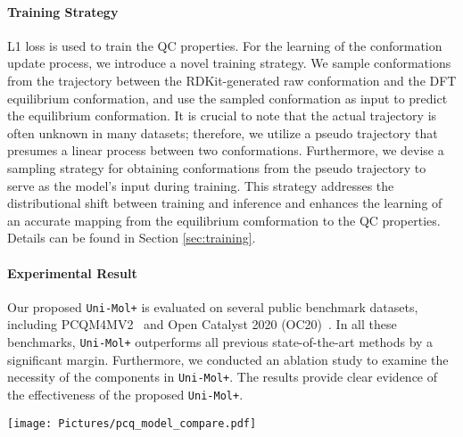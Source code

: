 \documentclass{article}
\newcommand{\name}{\texttt{Uni-Mol+}\xspace}
\begin{document}
\vspace{-6pt}
\paragraph{Training Strategy}
L1 loss is used to train the QC properties. For the learning of the conformation update process, we introduce a novel training strategy. We sample conformations from the trajectory between the RDKit-generated raw conformation and the DFT equilibrium conformation, and use the sampled conformation as input to predict the equilibrium conformation. It is crucial to note that the actual trajectory is often unknown in many datasets; therefore, we utilize a pseudo trajectory that presumes a linear process between two conformations. Furthermore, we devise a sampling strategy for obtaining conformations from the pseudo trajectory to serve as the model's input during training. 
This strategy addresses the distributional shift between training and inference and enhances the learning of an accurate mapping from the equilibrium comformation to the QC properties. Details can be found in Section \ref{sec:training}.


\vspace{-6pt}
\paragraph{Experimental Result}

Our proposed \name is evaluated on several public benchmark datasets, including PCQM4MV2~\cite{DBLP:conf/nips/HuFRNDL21} and Open Catalyst 2020 (OC20)~\cite{chanussot2021open}. In all these benchmarks, \name outperforms all previous state-of-the-art methods by a significant margin. Furthermore, we conducted an ablation study to examine the necessity of the components in \name.  
The results provide clear evidence of the effectiveness of the proposed \name.


 \begin{figure*}[!tbp]
\centering
\texttt{[image: Pictures/pcq\_model\_compare.pdf]}
\vspace{-10pt}
\caption{In contrast to prior methods that directly predict QC properties from 1D/2D data, \name uses a different approach. It first generates raw 3D conformation from 1D/2D data using cheap tools like RDKit, and then iteratively updates it towards the DFT equilibrium conformation. Finally, it predicts QC properties using the learned conformation. } \label{fig:pcq_model_compare}
\end{figure*}
\end{document}
